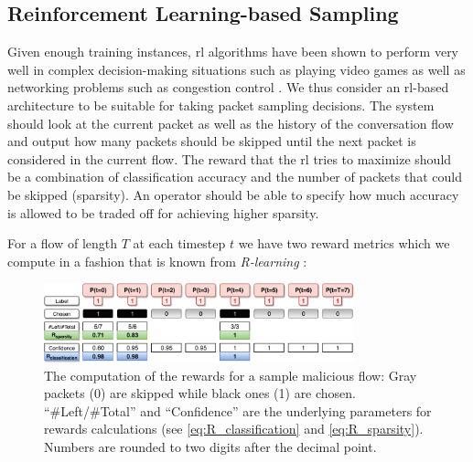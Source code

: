 \documentclass[conference]{IEEEtran}
\begin{document}
\subsection{Reinforcement Learning-based Sampling}
\label{subsec:rlForSampling}

Given enough training instances, \gls{rl} algorithms have been shown to perform very well in complex decision-making situations such as playing video games \cite{mnih_playing_2013} as well as networking problems such as congestion control \cite{bachl_rax_2019}. We thus consider an \gls{rl}-based architecture to be suitable for taking packet sampling decisions. The system should look at the current packet as well as the history of the conversation flow and output how many packets should be skipped until the next packet is considered in the current flow. The reward that the \gls{rl} tries to maximize should be a combination of classification accuracy and the number of packets that could be skipped (sparsity). An operator should be able to specify how much accuracy is allowed to be traded off for achieving higher sparsity.%


For a flow of length $T$ at each timestep $t$ we have two reward metrics which we compute in a fashion that is known from \textit{R-learning} \cite{schwartz_reinforcement_1993}:


\begin{figure}
\centering
  \includegraphics[width=0.8\textwidth]{img/rewards_calc_example.pdf}
  \caption{The computation of the rewards for a sample malicious flow: Gray packets (0) are skipped while black ones (1) are chosen. ``\#Left\//\#Total'' and ``Confidence'' are the underlying parameters for rewards calculations (see \autoref{eq:R_classification} and \autoref{eq:R_sparsity}). Numbers are rounded to two digits after the decimal point.}
  \label{fig:rewards}
\end{figure}
\end{document}
